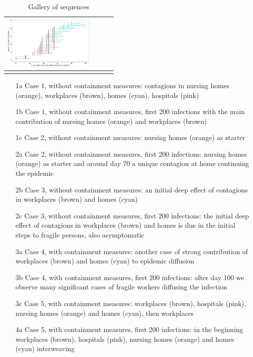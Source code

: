 \documentclass[graybox]{svmult}
\begin{document}
\begin{table}
\begin{tabular}{cccc}
 \includegraphics[width=12em]{sequences/withShort2.png} %
\\
 \hline\noalign{\smallskip}
 \end{tabular}
 \caption{Gallery of sequences}
 \label{gallery}
 \end{table}

\begin{itemize}
\item [1a] Case 1, without containment measures: contagions in nursing homes (orange), workplaces (brown), homes (cyan), hospitals (pink)
\item [1b] Case 1, without containment measures, first 200 infections with the main contribution of nursing homes (orange) and workplaces (brown)
\item [1c] Case 2, without containment measures: nursing homes (orange) as starter
\item [2a] Case 2, without containment measures, first 200 infections: nursing homes (orange) as starter and around day 70 a unique contagion at home continuing the epidemic
\item [2b] Case 3, without containment measures: an initial deep effect of contagions in workplaces (brown) and homes (cyan)
\item [2c] Case 3, without containment measures, first 200 infections: the initial deep effect of contagions in workplaces (brown) and homes is due in the initial steps to fragile persons, also asymptomatic
\item [3a] Case 4, with containment measures: another case of strong contribution of workplaces (brown) and homes (cyan) to epidemic diffusion
\item [3b] Case 4, with containment measures, first 200 infections: after day 100 we observe many significant cases of fragile workers diffusing the infection
\item [3c] Case 5, with containment measures: workplaces (brown), hospitals (pink), nursing homes (orange) and homes (cyan), then workplaces
\item [4a] Case 5, with containment measures, first 200 infections: in the beginning workplaces (brown), hospitals (pink), nursing homes (orange) and homes (cyan) interweaving

\end{itemize}
\end{document}
